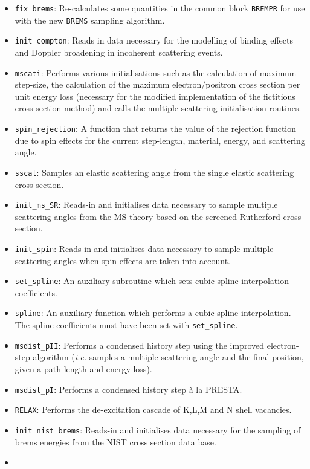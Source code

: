 \begin{itemize}
\item
{\tt fix\_brems}: Re-calculates some quantities in
the common block {\tt BREMPR} for use with the
new {\tt BREMS} sampling algorithm.
\item
{\tt init\_compton}: Reads in data necessary for
the modelling of binding effects and Doppler broadening
in incoherent scattering events.
\item
{\tt mscati}: Performs various initialisations such as
the calculation of maximum step-size, the calculation
of the maximum electron/positron cross section per
unit energy loss (necessary for the modified implementation of
the fictitious cross section method) and calls the multiple scattering
initialisation routines.
\item
{\tt spin\_rejection}: A function that returns the
value of the rejection function due to spin effects for the
current step-length, material, energy, and scattering angle.
\item
{\tt sscat}: Samples an elastic scattering angle from the
single elastic scattering cross section.
\item
{\tt init\_ms\_SR}: Reads-in and initialises data necessary to sample
multiple scattering angles from the MS theory based on the
screened Rutherford cross section.
\item
{\tt init\_spin}: Reads in and initialises data necessary to
sample multiple scattering angles when spin effects are taken
into account.
\item
{\tt set\_spline}: An auxiliary subroutine which sets cubic
spline interpolation coefficients.
\item
{\tt spline}: An auxiliary function which performs
a cubic spline interpolation. The spline coefficients
must have been set with {\tt set\_spline}.
\item
{\tt msdist\_pII}: Performs a condensed history step
using the improved electron-step algorithm ({\em i.e.}
samples a multiple scattering angle and  the final
position, given a path-length and energy loss).
\item
{\tt msdist\_pI}: Performs a condensed history step
\`{a} la PRESTA.
\item
{\tt RELAX}: Performs the de-excitation cascade of K,L,M and
N shell vacancies.
\item
{\tt init\_nist\_brems}: Reads-in and initialises data necessary
for the sampling of brems energies from the NIST
cross section data base.
\item

\end{itemize}
